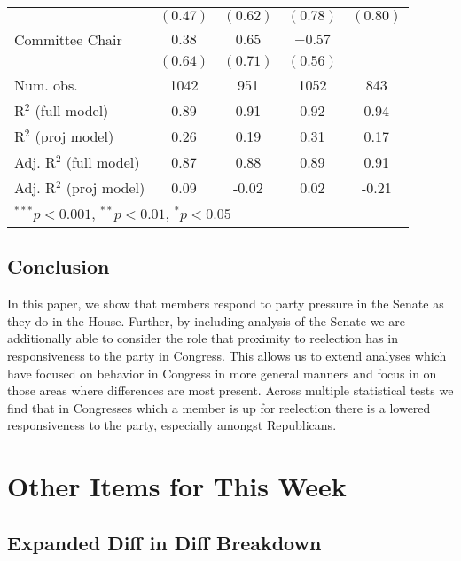 \documentclass[12pt]{article}
\begin{document}
\begin{table}[H]
\begin{center}
\begin{tabular}{l c c c c }
			& $(0.47)$     & $(0.62)$      & $(0.78)$      & $(0.80)$     \\
			Committee Chair                   & $0.38$       & $0.65$        & $-0.57$       &              \\
			& $(0.64)$     & $(0.71)$      & $(0.56)$      &              \\
			\hline
			Num. obs.               & 1042         & 951           & 1052          & 843          \\
			R$^2$ (full model)      & 0.89         & 0.91          & 0.92          & 0.94         \\
			R$^2$ (proj model)      & 0.26         & 0.19          & 0.31          & 0.17         \\
			Adj. R$^2$ (full model) & 0.87         & 0.88          & 0.89          & 0.91         \\
			Adj. R$^2$ (proj model) & 0.09         & -0.02         & 0.02          & -0.21        \\
			\hline
			\multicolumn{5}{l}{\scriptsize{$^{***}p<0.001$, $^{**}p<0.01$, $^*p<0.05$}}
		\end{tabular}
	\end{center}
\end{table}

\subsection{Conclusion}

In this paper, we show that members respond to party pressure in the Senate as they do in the House. Further, by including analysis of the Senate we are additionally able to consider the role that proximity to reelection has in responsiveness to the party in Congress. This allows us to extend analyses which have focused on behavior in Congress in more general manners and focus in on those areas where differences are most present. Across multiple statistical tests we find that in Congresses which a member is up for reelection there is a lowered responsiveness to the party, especially amongst Republicans.

\section{Other Items for This Week}

\subsection{Expanded Diff in Diff Breakdown}
\end{document}

